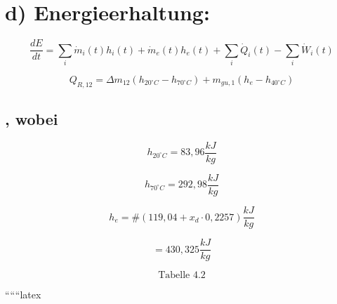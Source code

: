 \section*{d) Energieerhaltung:}

\[
\frac{dE}{dt} = \sum_i \dot{m}_i(t) h_i(t) + \dot{m}_e(t) h_e(t) + \sum_i \dot{Q}_i(t) - \sum_i \dot{W}_i(t)
\]

\[
Q_{R,12} = \Delta m_{12} (h_{20^\circ C} - h_{70^\circ C}) + m_{gu,1} (h_e - h_{40^\circ C})
\]

\subsection*{, wobei}

\[
h_{20^\circ C} = 83{,}96 \frac{kJ}{kg}
\]

\[
h_{70^\circ C} = 292{,}98 \frac{kJ}{kg}
\]

\[
h_e = \# (119{,}04 + x_d \cdot 0{,}2257) \frac{kJ}{kg}
\]

\[
= 430{,}325 \frac{kJ}{kg}
\]

\[
\text{Tabelle 4.2}
\]

``````latex